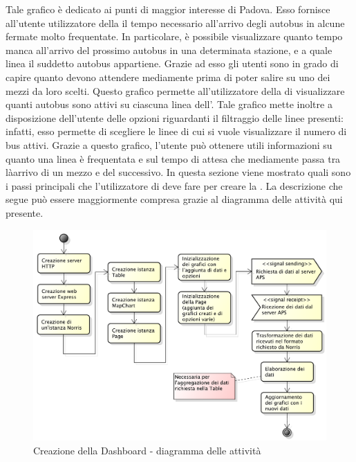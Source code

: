     		Tale grafico è dedicato ai punti di maggior interesse di Padova. Esso fornisce all'utente utilizzatore della  il tempo necessario all'arrivo degli autobus in alcune fermate  molto frequentate. In particolare, è possibile visualizzare quanto tempo manca all'arrivo del prossimo autobus in una determinata stazione, e a quale linea il suddetto autobus appartiene. Grazie ad esso gli utenti sono in grado di capire quanto devono attendere mediamente prima di poter salire su uno dei mezzi da loro scelti.
    		Questo grafico permette all'utilizzatore della  di visualizzare quanti autobus sono attivi su ciascuna linea dell'. Tale grafico mette inoltre a disposizione dell'utente delle opzioni riguardanti il filtraggio delle linee presenti: infatti, esso permette di scegliere le linee di cui si vuole visualizzare il numero di bus attivi. Grazie a questo grafico, l'utente può ottenere utili informazioni su quanto una linea è frequentata e sul tempo di attesa che mediamente passa tra làarrivo di un mezzo e del successivo.
        In questa sezione viene mostrato quali sono i passi principali che l'utilizzatore di  deve fare per creare la  . La descrizione che segue può essere maggiormente compresa grazie al diagramma delle attività qui presente.
        \begin{figure}[H]\centering
            \includegraphics[width=\textwidth]{SpecificaTecnica/Pics/CreateDashboard}
            \caption{Creazione della Dashboard - diagramma delle attività}
        \end{figure}
